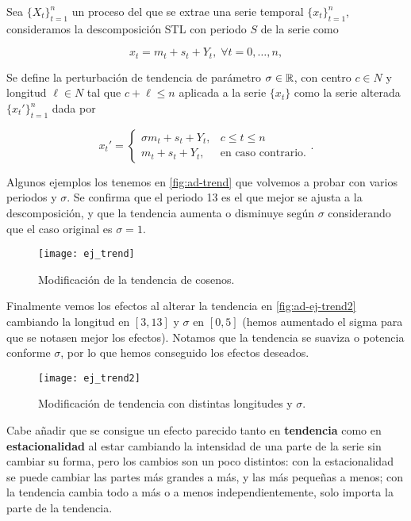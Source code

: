 \begin{definicion}
  Sea $\{X_t\}_{t = 1}^n$ un proceso del que se extrae una serie temporal $\{x_t\}_{t = 1}^n$, consideramos la descomposición STL con periodo $S$ de la serie como

  $$x_t = m_t + s_t + Y_t, \; \forall t = 0, \ldots, n,$$

  Se define la perturbación de tendencia de parámetro $\sigma \in \mathbb{R}$, con centro $c \in N$ y longitud $\ell \in N$ tal que $c + \ell \leq n$ aplicada a la serie $\{x_t\}$ como la serie alterada $\{x_t'\}_{t = 1}^n$ dada por

  $$x_t' = \begin{cases}
    \sigma m_t + s_{t} + Y_t, & c \leq t \leq n \\
    m_t + s_t + Y_t, & \text{en caso contrario.}
  \end{cases}.$$
  \label{def:stl-tendencia}
\end{definicion}

Algunos ejemplos los tenemos en \autoref{fig:ad-trend} que volvemos a probar con varios periodos y $\sigma$. Se confirma que el periodo 13 es el que mejor se ajusta a la descomposición, y que la tendencia aumenta o disminuye según $\sigma$ considerando que el caso original es $\sigma = 1$.

\begin{figure}[htpb]
  \centering
  \texttt{[image: ej\_trend]}
  \caption{Modificación de la tendencia de cosenos.}
  \label{fig:ad-trend}
\end{figure}

Finalmente vemos los efectos al alterar la tendencia en \autoref{fig:ad-ej-trend2} cambiando la longitud en $[3, 13]$ y $\sigma$ en $[0, 5]$ (hemos aumentado el sigma para que se notasen mejor los efectos). Notamos que la tendencia se suaviza o potencia conforme $\sigma$, por lo que hemos conseguido los efectos deseados.

\begin{figure}[htpb]
  \centering
  \texttt{[image: ej\_trend2]}
  \caption{Modificación de tendencia con distintas longitudes y $\sigma$.}
  \label{fig:ad-ej-trend2}
\end{figure}

Cabe añadir que se consigue un efecto parecido tanto en \textbf{tendencia} como en \textbf{estacionalidad} al estar cambiando la intensidad de una parte de la serie sin cambiar su forma, pero los cambios son un poco distintos: con la estacionalidad se puede cambiar las partes más grandes a más, y las más pequeñas a menos; con la tendencia cambia todo a más o a menos independientemente, solo importa la parte de la tendencia.

